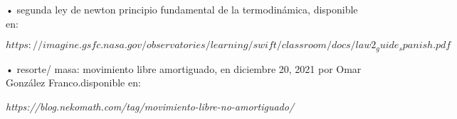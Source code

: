 \documentclass[12pt,a4paper]{article}
\begin{document}
\begin{flushleft}
• segunda ley de newton principio fundamental de la termodinámica, disponible en:


\vspace{0.3cm}

\emph{ $https://imagine.gsfc.nasa.gov/observatories/learning/swift/classroom/docs/law2_guide_spanish.pdf$}

\vspace{1.2cm}

•  resorte/ masa: movimiento libre amortiguado, en diciembre 20, 2021 por Omar González Franco.disponible en:       
                      
\vspace{0.3cm}              

\emph{https://blog.nekomath.com/tag/movimiento-libre-no-amortiguado/} 


\end{flushleft}
\end{document}
